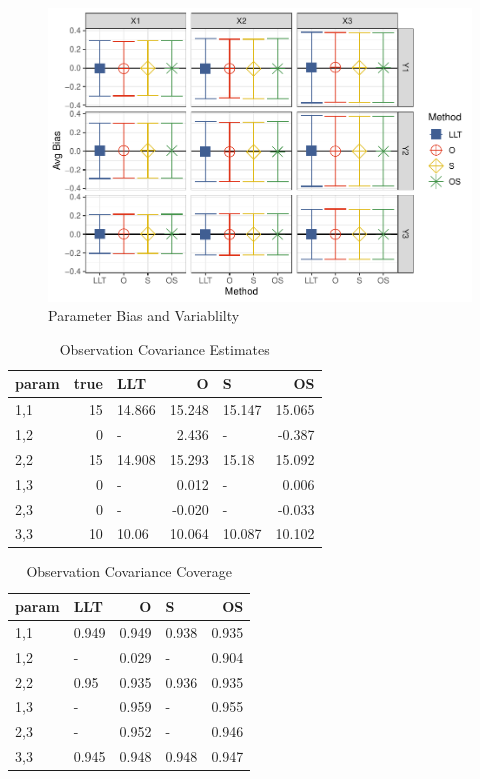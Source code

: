 \documentclass[
]{article}
\begin{document}
\begin{figure}
\centering
\includegraphics{FullSimulation_files/figure-latex/unnamed-chunk-15-1.pdf}
\caption{\label{fig:unnamed-chunk-15}Parameter Bias and Variablilty}
\end{figure}

\begin{longtable}[t]{l|r|l|r|l|r}
\caption{\label{tab:unnamed-chunk-16}Observation Covariance Estimates}\\
\hline
param & true & LLT & O & S & OS\\
\hline
1,1 & 15 & 14.866 & 15.248 & 15.147 & 15.065\\
\hline
1,2 & 0 & - & 2.436 & - & -0.387\\
\hline
2,2 & 15 & 14.908 & 15.293 & 15.18 & 15.092\\
\hline
1,3 & 0 & - & 0.012 & - & 0.006\\
\hline
2,3 & 0 & - & -0.020 & - & -0.033\\
\hline
3,3 & 10 & 10.06 & 10.064 & 10.087 & 10.102\\
\hline
\end{longtable}

\begin{longtable}[t]{l|l|r|l|r}
\caption{\label{tab:unnamed-chunk-17}Observation Covariance Coverage}\\
\hline
param & LLT & O & S & OS\\
\hline
1,1 & 0.949 & 0.949 & 0.938 & 0.935\\
\hline
1,2 & - & 0.029 & - & 0.904\\
\hline
2,2 & 0.95 & 0.935 & 0.936 & 0.935\\
\hline
1,3 & - & 0.959 & - & 0.955\\
\hline
2,3 & - & 0.952 & - & 0.946\\
\hline
3,3 & 0.945 & 0.948 & 0.948 & 0.947\\
\hline
\end{longtable}
\end{document}
